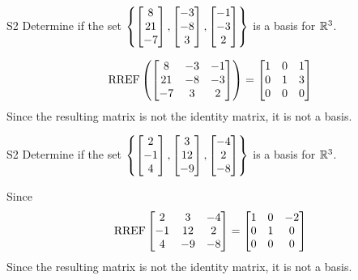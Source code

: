 \begin{problem}{S2}
Determine if the set
\(\left\{
  \begin{bmatrix} 8 \\ 21 \\ -7 \end{bmatrix},
  \begin{bmatrix} -3 \\ -8 \\ 3 \end{bmatrix},
  \begin{bmatrix} -1 \\ -3 \\ 2 \end{bmatrix}
\right\}\) is a basis for \(\mathbb{R}^3\).
\end{problem}
\begin{solution}
\[\operatorname{RREF}\left(\begin{bmatrix} 8 & -3 & -1  \\ 21 & -8 & -3  \\ -7 & 3 & 2  \end{bmatrix} \right) = \begin{bmatrix} 1 & 0 & 1  \\ 0 & 1 & 3  \\ 0 & 0 & 0 \end{bmatrix}\]
Since the resulting matrix is not the identity matrix, it is not a basis.
\end{solution}

\begin{problem}{S2}
Determine if the set
\(
  \left\{
    \begin{bmatrix} 2 \\ -1 \\ 4 \end{bmatrix},
    \begin{bmatrix} 3 \\ 12 \\ -9 \end{bmatrix},
    \begin{bmatrix} -4 \\ 2 \\ -8 \end{bmatrix}
  \right\}
\) is a basis for \(\mathbb{R}^3\).
\end{problem}
\begin{solution}
Since
\[
  \operatorname{RREF}\begin{bmatrix}
    2 & 3 &  -4 \\
    -1 & 12 &  2 \\
    4 & -9 &  -8
  \end{bmatrix} =
  \begin{bmatrix}
    1 & 0 & -2 \\
    0 & 1 & 0 \\
    0 & 0 & 0
  \end{bmatrix}
\]
Since the resulting matrix is not the identity matrix, it is not a basis.
\end{solution}

